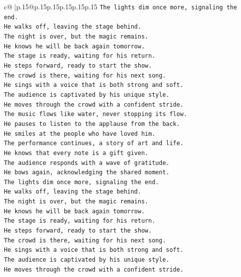 \documentclass{article}
\begin{document}
{\begin{supertabular}{c@{$\;$}|p{.15\linewidth}@{}p{.15\linewidth}p{.15\linewidth}p{.15\linewidth}p{.15\linewidth}p{.15\linewidth}}
{{{\texttt{The lights dim once more, signaling the end.} \\
\texttt{He walks off, leaving the stage behind.} \\
\texttt{The night is over, but the magic remains.} \\
\texttt{He knows he will be back again tomorrow.} \\
\texttt{The stage is ready, waiting for his return.} \\
\texttt{He steps forward, ready to start the show.} \\
\texttt{The crowd is there, waiting for his next song.} \\
\texttt{He sings with a voice that is both strong and soft.} \\
\texttt{The audience is captivated by his unique style.} \\
\texttt{He moves through the crowd with a confident stride.} \\
\texttt{The music flows like water, never stopping its flow.} \\
\texttt{He pauses to listen to the applause from the back.} \\
\texttt{He smiles at the people who have loved him.} \\
\texttt{The performance continues, a story of art and life.} \\
\texttt{He knows that every note is a gift given.} \\
\texttt{The audience responds with a wave of gratitude.} \\
\texttt{He bows again, acknowledging the shared moment.} \\
\texttt{The lights dim once more, signaling the end.} \\
\texttt{He walks off, leaving the stage behind.} \\
\texttt{The night is over, but the magic remains.} \\
\texttt{He knows he will be back again tomorrow.} \\
\texttt{The stage is ready, waiting for his return.} \\
\texttt{He steps forward, ready to start the show.} \\
\texttt{The crowd is there, waiting for his next song.} \\
\texttt{He sings with a voice that is both strong and soft.} \\
\texttt{The audience is captivated by his unique style.} \\
\texttt{He moves through the crowd with a confident stride.} \\
}}}
\end{supertabular}}
\end{document}
